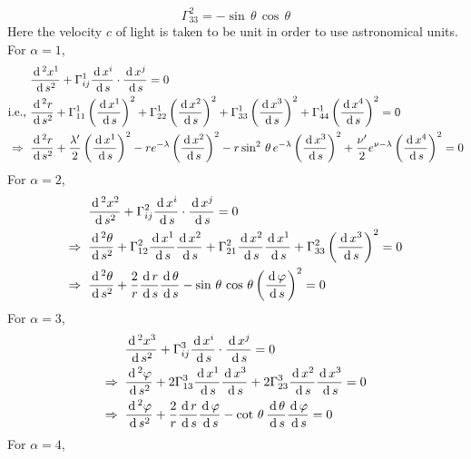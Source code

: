 \documentclass[../main-sheet.tex]{subfiles}
\begin{document}
\begin{soln}
\[            \Gamma_{33}^2=-\sin\,\theta\,\cos\,\theta
        \]
        Here the velocity \(c\) of light is taken to be unit in order to use astronomical units.\\
        For \(\alpha=1\),
        \begin{align}
            &\frac{\,\mathrm{d}\,^2 x^1}{\,\mathrm{d}\, s^2}+\Gamma_{ij}^1 \frac{\,\mathrm{d}\, x^i}{\,\mathrm{d}\, s}\cdot \frac{\,\mathrm{d}\, x^j}{\,\mathrm{d}\, s}=0\notag\\
            \text{i.e., }&\frac{\,\mathrm{d}\,^2 r}{\,\mathrm{d}\, s^2}+\Gamma_{11}^1\left( \frac{\,\mathrm{d}\, x^1}{\,\mathrm{d}\, s} \right)^2+\Gamma_{22}^1\left( \frac{\,\mathrm{d}\, x^2}{\,\mathrm{d}\, s} \right)^2+\Gamma_{33}^1\left( \frac{\,\mathrm{d}\, x^3}{\,\mathrm{d}\, s} \right)^2+\Gamma_{44}^1\left( \frac{\,\mathrm{d}\, x^4}{\,\mathrm{d}\, s} \right)^2=0\notag\\
            \Rightarrow\;\; & \frac{\,\mathrm{d}\,^2 r}{\,\mathrm{d}\, s^2}+\frac{\lambda '}{2}\left( \frac{\,\mathrm{d}\, x^1}{\,\mathrm{d}\, s} \right)^2-r e^{-\lambda}\left( \frac{\,\mathrm{d}\, x^2}{\,\mathrm{d}\, s} \right)^2-r \sin^2\,\theta\,e^{-\lambda}\left( \frac{\,\mathrm{d}\, x^3}{\,\mathrm{d}\, s} \right)^2+\frac{\nu '}{2}e^{\nu-\lambda}\left( \frac{\,\mathrm{d}\, x^4}{\,\mathrm{d}\, s} \right)^2=0
            \label{eq:planet3}
        \end{align}
        For \(\alpha=2\),
        \begin{align}
            &\frac{\,\mathrm{d}\,^2 x^2}{\,\mathrm{d}\, s^2}+\Gamma_{ij}^2 \frac{\,\mathrm{d}\, x^i}{\,\mathrm{d}\, s}\cdot \frac{\,\mathrm{d}\, x^j}{\,\mathrm{d}\, s}=0\notag\\
            \Rightarrow\;\; & \frac{\,\mathrm{d}\,^2 \theta}{\,\mathrm{d}\, s^2}+\Gamma_{12}^2\frac{\,\mathrm{d}\, x^1}{\,\mathrm{d}\, s}\frac{\,\mathrm{d}\, x^2}{\,\mathrm{d}\, s}+\Gamma_{21}^2\frac{\,\mathrm{d}\, x^2}{\,\mathrm{d}\, s}\frac{\,\mathrm{d}\, x^1}{\,\mathrm{d}\, s}+\Gamma_{33}^2\left( \frac{\,\mathrm{d}\, x^3}{\,\mathrm{d}\, s} \right)^2=0\notag\\
            \Rightarrow\;\; & \frac{\,\mathrm{d}\,^2 \theta}{\,\mathrm{d}\, s^2}+\frac{2}{r}\frac{\,\mathrm{d}\, r}{\,\mathrm{d}\, s}\frac{\,\mathrm{d}\, \theta}{\,\mathrm{d}\, s}-\sin\,\theta\,\cos\,\theta \left( \frac{\,\mathrm{d}\, \varphi}{\,\mathrm{d}\, s} \right)^2=0
            \label{eq:planet4}
        \end{align}
        For \(\alpha=3\),
        \begin{align}
            &\frac{\,\mathrm{d}\,^2 x^3}{\,\mathrm{d}\, s^2}+\Gamma_{ij}^3 \frac{\,\mathrm{d}\, x^i}{\,\mathrm{d}\, s}\cdot \frac{\,\mathrm{d}\, x^j}{\,\mathrm{d}\, s}=0\notag\\
            \Rightarrow\;\; & \frac{\,\mathrm{d}\,^2 \varphi}{\,\mathrm{d}\, s^2}+2\Gamma_{13}^3\frac{\,\mathrm{d}\, x^1}{\,\mathrm{d}\, s}\frac{\,\mathrm{d}\, x^3}{\,\mathrm{d}\, s}+2\Gamma_{23}^3\frac{\,\mathrm{d}\, x^2}{\,\mathrm{d}\, s}\frac{\,\mathrm{d}\, x^3}{\,\mathrm{d}\, s}=0\notag\\
            \Rightarrow\;\; & \frac{\,\mathrm{d}\,^2 \varphi}{\,\mathrm{d}\, s^2}+\frac{2}{r}\frac{\,\mathrm{d}\, r}{\,\mathrm{d}\, s}\frac{\,\mathrm{d}\, \varphi}{\,\mathrm{d}\, s}-\cot\,\theta\, \frac{\,\mathrm{d}\, \theta}{\,\mathrm{d}\, s}\frac{\,\mathrm{d}\, \varphi}{\,\mathrm{d}\, s}=0
            \label{eq:planet5}
        \end{align}
        For \(\alpha=4\),

\end{soln}
\end{document}
